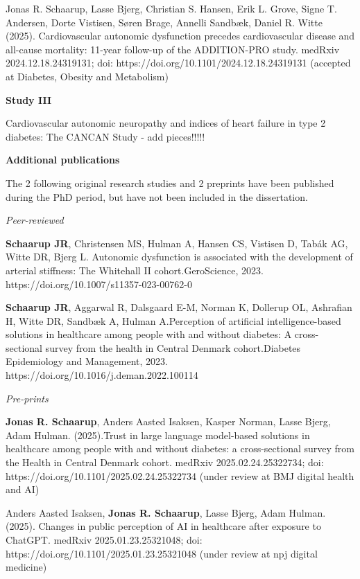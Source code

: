 \documentclass[
  a4paper,
  headsepline=true,
  open=any]{scrbook}
\begin{document}
Jonas R. Schaarup, Lasse Bjerg, Christian S. Hansen, Erik L. Grove,
Signe T. Andersen, Dorte Vistisen, Søren Brage, Annelli Sandbæk, Daniel
R. Witte (2025). Cardiovascular autonomic dysfunction precedes
cardiovascular disease and all-cause mortality: 11-year follow-up of the
ADDITION-PRO study. medRxiv 2024.12.18.24319131; doi:
https://doi.org/10.1101/2024.12.18.24319131 (accepted at Diabetes,
Obesity and Metabolism)

\textbf{Study III}

Cardiovascular autonomic neuropathy and indices of heart failure in type
2 diabetes: The CANCAN Study - add pieces!!!!!

\newpage

\textbf{Additional publications}

The 2 following original research studies and 2 preprints have been
published during the PhD period, but have not been included in the
dissertation.

\emph{Peer-reviewed}

\textbf{Schaarup JR}, Christensen MS, Hulman A, Hansen CS, Vistisen D,
Tabák AG, Witte DR, Bjerg L. Autonomic dysfunction is associated with
the development of arterial stiffness: The Whitehall II
cohort.GeroScience, 2023. https://doi.org/10.1007/s11357-023-00762-0

\textbf{Schaarup JR}, Aggarwal R, Dalsgaard E-M, Norman K, Dollerup OL,
Ashrafian H, Witte DR, Sandbæk A, Hulman A.Perception of artificial
intelligence-based solutions in healthcare among people with and without
diabetes: A cross-sectional survey from the health in Central Denmark
cohort.Diabetes Epidemiology and Management, 2023.
https://doi.org/10.1016/j.deman.2022.100114

\emph{Pre-prints}

\textbf{Jonas R. Schaarup}, Anders Aasted Isaksen, Kasper Norman, Lasse
Bjerg, Adam Hulman. (2025).Trust in large language model-based solutions
in healthcare among people with and without diabetes: a cross-sectional
survey from the Health in Central Denmark cohort. medRxiv
2025.02.24.25322734; doi: https://doi.org/10.1101/2025.02.24.25322734
(under review at BMJ digital health and AI)

Anders Aasted Isaksen, \textbf{Jonas R. Schaarup}, Lasse Bjerg, Adam
Hulman. (2025). Changes in public perception of AI in healthcare after
exposure to ChatGPT. medRxiv 2025.01.23.25321048; doi:
https://doi.org/10.1101/2025.01.23.25321048 (under review at npj digital
medicine)

\newpage
\end{document}
